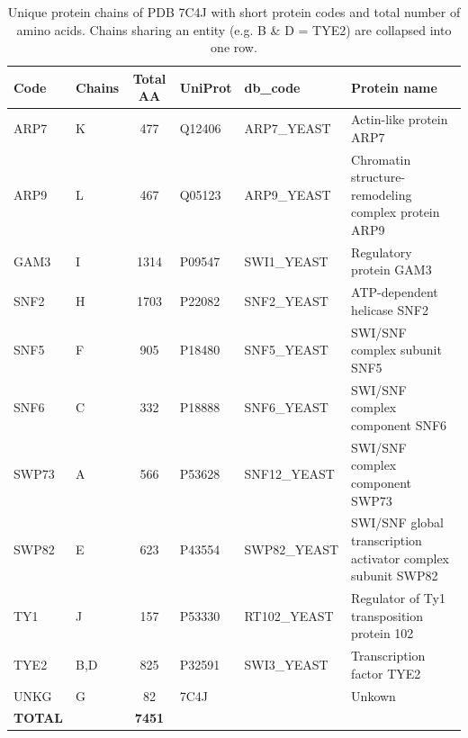 \begin{table}[htbp]
  \centering\small
  \begin{tabular}{@{}llrllp{6.8cm}@{}}
    \toprule
    Code & Chains & \multicolumn{1}{c}{Total AA} & UniProt & db\_code & Protein name \\
    \midrule
    ARP7 & K & \multicolumn{1}{c}{477} & Q12406 & ARP7_YEAST & Actin-like protein ARP7 \\
    ARP9 & L & \multicolumn{1}{c}{467} & Q05123 & ARP9_YEAST & Chromatin structure-remodeling complex protein ARP9 \\
    GAM3 & I & \multicolumn{1}{c}{1314} & P09547 & SWI1_YEAST & Regulatory protein GAM3 \\
    SNF2 & H & \multicolumn{1}{c}{1703} & P22082 & SNF2_YEAST & ATP-dependent helicase SNF2 \\
    SNF5 & F & \multicolumn{1}{c}{905} & P18480 & SNF5_YEAST & SWI/SNF complex subunit SNF5 \\
    SNF6 & C & \multicolumn{1}{c}{332} & P18888 & SNF6_YEAST & SWI/SNF complex component SNF6 \\
    SWP73 & A & \multicolumn{1}{c}{566} & P53628 & SNF12_YEAST & SWI/SNF complex component SWP73 \\
    SWP82 & E & \multicolumn{1}{c}{623} & P43554 & SWP82_YEAST & SWI/SNF global transcription activator complex subunit SWP82 \\
    TY1 & J & \multicolumn{1}{c}{157} & P53330 & RT102_YEAST & Regulator of Ty1 transposition protein 102 \\
    TYE2 & B,D & \multicolumn{1}{c}{825} & P32591 & SWI3_YEAST & Transcription factor TYE2 \\
    UNKG & G & \multicolumn{1}{c}{82} & 7C4J &  & Unkown \\
    \midrule
    \textbf{TOTAL} & & \multicolumn{1}{c}{\textbf{7451}} & & & \\
    \bottomrule
  \end{tabular}
  \caption{Unique protein chains of PDB 7C4J with short protein codes and total number of amino acids. Chains sharing an entity (e.g. B \& D = TYE2) are collapsed into one row.}
  \label{tab:7c4j_protein_aa}
\end{table}
